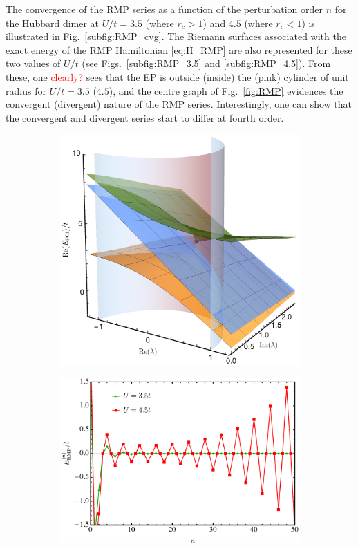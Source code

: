 \documentclass[aps,prb,reprint,noshowkeys,superscriptaddress]{revtex4-1}
\newcommand{\titou}[1]{\textcolor{red}{#1}}
\begin{document}
The convergence of the RMP series as a function of the perturbation order $n$ for the Hubbard dimer at $U/t = 3.5$ (where $r_c > 1$) and $4.5$ (where $r_c < 1$) is illustrated in Fig.~\ref{subfig:RMP_cvg}.
The Riemann surfaces associated with the exact energy of the RMP Hamiltonian \eqref{eq:H_RMP} are also represented for these two values of $U/t$ (see Figs.~\ref{subfig:RMP_3.5} and \ref{subfig:RMP_4.5}).
From these, one \titou{clearly?} sees that the EP is outside (inside) the (pink) cylinder of unit radius for $U/t = 3.5$ ($4.5$),
and the centre graph of Fig.~\ref{fig:RMP} evidences the convergent (divergent) nature of the RMP series.
Interestingly, one can show that the convergent and divergent series start to differ at fourth order.

\begin{figure}
	\begin{subfigure}{0.32\textwidth}
	\includegraphics[height=0.75\textwidth]{fig2a}	
    \end{subfigure}
    \begin{subfigure}{0.32\textwidth}
	\includegraphics[height=0.75\textwidth]{fig2b}

\end{subfigure}
\end{figure}
\end{document}
